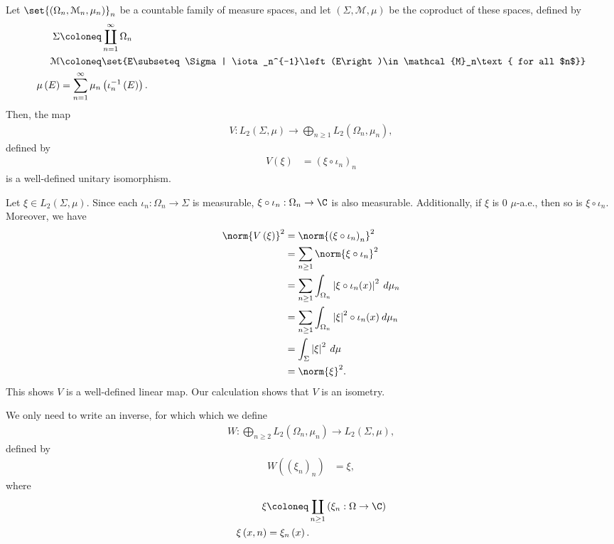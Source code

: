 \documentclass[10pt]{mypackage}
\begin{document}
\begin{example}
  Let $\set{\left(\Omega_n,\mathcal{M}_n,\mu_n\right)}_{n}$ be a countable family of measure spaces, and let $\left(\Sigma,\mathcal{M},\mu\right)$ be the coproduct of these spaces, defined by
  \begin{align*}
    \Sigma &\coloneq \coprod_{n=1}^{\infty}\Omega_n\\
    \mathcal{M}&\coloneq \set{E\subseteq \Sigma | \iota_n^{-1}\left(E\right)\in \mathcal{M}_n\text{ for all $n$}}\\
    \mu\left(E\right) &= \sum_{n=1}^{\infty}\mu_n\left(\iota_n^{-1}\left(E\right)\right).
  \end{align*}
  Then, the map
  \begin{align*}
    V: L_{2}\left(\Sigma,\mu\right) \rightarrow \bigoplus_{n\geq 1}L_2\left(\Omega_n,\mu_n\right),
  \end{align*}
  defined by
  \begin{align*}
    V\left(\xi\right) &= \left(\xi\circ \iota_n\right)_n
  \end{align*}
  is a well-defined unitary isomorphism.\newline

  Let $\xi \in L_{2}\left(\Sigma,\mu\right)$. Since each $\iota_n: \Omega_n\rightarrow \Sigma$ is measurable, $\xi\circ \iota_n: \Omega_n\rightarrow \C$ is also measurable. Additionally, if $\xi$ is $0$ $\mu$-a.e., then so is $\xi\circ \iota_n$. Moreover, we have
  \begin{align*}
    \norm{V\left(\xi\right)}^2 &= \norm{\left(\xi\circ \iota_n\right)_n}^2\\
                               &= \sum_{n\geq 1}\norm{\xi\circ \iota_n}^2\\
                               &= \sum_{n\geq 1}\int_{\Omega_n}^{} \left\vert \xi\circ \iota_n(x) \right\vert^2\:d\mu_n\\
                               &= \sum_{n\geq 1}\int_{\Omega_n}^{} \left\vert \xi \right\vert^2\circ \iota_n(x)\:d\mu_n\\
                               &= \int_{\Sigma}^{} \left\vert \xi \right\vert^2\:d\mu\\
                               &= \norm{\xi}^2.
  \end{align*}
  This shows $V$ is a well-defined linear map. Our calculation shows that $V$ is an isometry.\newline

  We only need to write an inverse, for which which we define
  \begin{align*}
    W: \bigoplus_{n\geq 2}L_{2}\left(\Omega_n,\mu_n\right)\rightarrow L_2\left(\Sigma,\mu\right),
  \end{align*}
  defined by
  \begin{align*}
    W\left(\left(\xi_n\right)_n\right) &= \xi,
  \end{align*}
  where
  \begin{align*}
    \xi &\coloneq \coprod_{n\geq 1}\left(\xi_n: \Omega\rightarrow \C\right)\\
    \xi\left(x,n\right) &= \xi_n\left(x\right).
  \end{align*}
\end{example}
\end{document}
